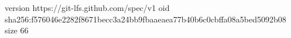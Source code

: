 version https://git-lfs.github.com/spec/v1
oid sha256:f576046e2282f8671becc3a24bb9fbaaeaea77b40b6c0cbffa08a5bed5092b08
size 66
